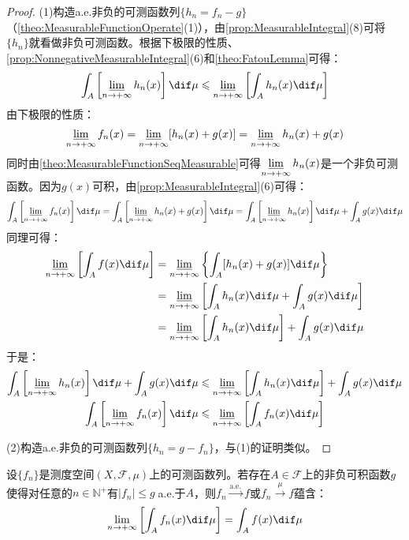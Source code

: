 \begin{proof}
	(1)构造a.e.非负的可测函数列$\{h_n=f_n-g\}$（\cref{theo:MeasurableFunctionOperate}(1)），由\cref{prop:MeasurableIntegral}(8)可将$\{h_n\}$就看做非负可测函数。根据下极限的性质、\cref{prop:NonnegativeMeasurableIntegral}(6)和\cref{theo:FatouLemma}可得：
	\begin{equation*}
		\int_{A}\left[\varliminf_{n\to+\infty}h_n(x)\right]\dif\mu\leqslant\varliminf_{n\to+\infty}\left[\int_{A}h_n(x)\dif\mu\right]
	\end{equation*}
	由下极限的性质：
	\begin{equation*}
		\varliminf_{n\to+\infty}f_n(x)=\varliminf_{n\to+\infty}[h_n(x)+g(x)]=\varliminf_{n\to+\infty}h_n(x)+g(x)
	\end{equation*}
	同时由\cref{theo:MeasurableFunctionSeqMeasurable}可得$\varliminf\limits_{n\to+\infty}h_n(x)$是一个非负可测函数。因为$g(x)$可积，由\cref{prop:MeasurableIntegral}(6)可得：
	\begin{equation*}
		\int_{A}\left[\varliminf_{n\to+\infty}f_n(x)\right]\dif\mu=\int_{A}\left[\varliminf_{n\to+\infty}h_n(x)+g(x)\right]\dif\mu=\int_{A}\left[\varliminf_{n\to+\infty}h_n(x)\right]\dif\mu+\int_{A}g(x)\dif\mu
	\end{equation*}
	同理可得：
	\begin{align*}
		\varliminf_{n\to+\infty}\left[\int_{A}f(x)\dif\mu\right]&=\varliminf_{n\to+\infty}\left\{\int_{A}[h_n(x)+g(x)]\dif\mu\right\} \\
		&=\varliminf_{n\to+\infty}\left[\int_{A}h_n(x)\dif\mu+\int_{A}g(x)\dif\mu\right] \\
		&=\varliminf_{n\to+\infty}\left[\int_{A}h_n(x)\dif\mu\right]+\int_{A}g(x)\dif\mu
	\end{align*}
	于是：
	\begin{gather*}
		\int_{A}\left[\varliminf_{n\to+\infty}h_n(x)\right]\dif\mu+\int_{A}g(x)\dif\mu\leqslant\varliminf_{n\to+\infty}\left[\int_{A}h_n(x)\dif\mu\right]+\int_{A}g(x)\dif\mu \\
		\int_{A}\left[\varliminf_{n\to+\infty}f_n(x)\right]\dif\mu\leqslant\varliminf_{n\to+\infty}\left[\int_{A}f_n(x)\dif\mu\right]
	\end{gather*}\par
	(2)构造a.e.非负的可测函数列$\{h_n=g-f_n\}$，与(1)的证明类似。
\end{proof}
\begin{theorem}[Lebesgue控制收敛定理]\label{theo:DominatedConvergenceTheorem}
	设$\{f_n\}$是测度空间$(X,\mathscr{F},\mu)$上的可测函数列。若存在$A\in\mathscr{F}$上的非负可积函数$g$使得对任意的$n\in\mathbb{N}^+$有$|f_n|\leqslant g\;$a.e.于$A$，则$f_n\overset{\text{a.e.}}{\longrightarrow}f$或$f_n\overset{\mu}{\longrightarrow}f$蕴含：
	\begin{equation*}
		\lim_{n\to+\infty}\left[\int_{A}f_n(x)\dif\mu\right]=\int_{A}f(x)\dif\mu
	\end{equation*}
\end{theorem}
